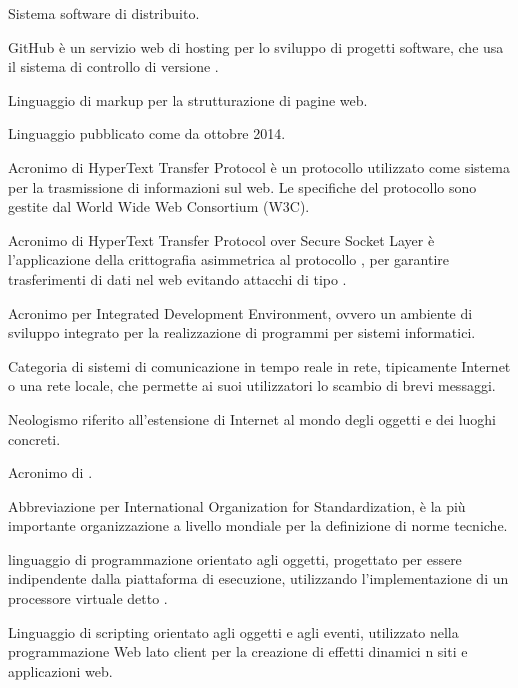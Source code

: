 Sistema software di  distribuito.

GitHub è un servizio web di hosting per lo sviluppo di progetti software, che usa il sistema di controllo di versione .
\clearpage

Linguaggio di markup per la strutturazione di pagine web.

Linguaggio  pubblicato come  da ottobre 2014.

Acronimo di HyperText Transfer Protocol \`e un protocollo utilizzato come sistema per la trasmissione di informazioni sul web. Le specifiche del protocollo sono gestite dal World Wide Web Consortium (W3C).

Acronimo di  HyperText Transfer Protocol over Secure Socket Layer \`e l'applicazione della crittografia asimmetrica al protocollo , per garantire trasferimenti di dati nel web evitando attacchi di tipo .
\clearpage

Acronimo per Integrated Development Environment, ovvero un ambiente di sviluppo integrato per la realizzazione di programmi per sistemi informatici.

Categoria di sistemi di comunicazione in tempo reale in rete, tipicamente Internet o una rete locale, che permette ai suoi utilizzatori lo scambio di brevi messaggi.

Neologismo riferito all'estensione di Internet al mondo degli oggetti e dei luoghi concreti.

Acronimo di .

Abbreviazione per International Organization for Standardization, è la più importante organizzazione a livello mondiale per la definizione di norme tecniche.
\clearpage

linguaggio di programmazione orientato agli oggetti, progettato per essere indipendente dalla piattaforma di esecuzione, utilizzando l'implementazione di un processore virtuale detto .

Linguaggio di scripting orientato agli oggetti e agli eventi, utilizzato nella programmazione Web lato client per la creazione di effetti dinamici n siti e applicazioni web.

